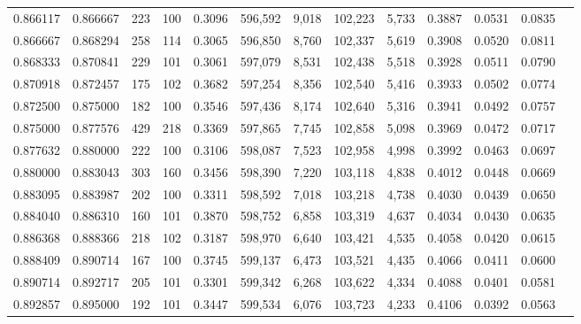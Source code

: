 \begin{tabular}{rrrrrrrrrrrrr}
0.866117 & 0.866667 &    223 &   100 &                                     0.3096 & 596,592 &   9,018 & 102,223 &   5,733 & 0.3887 & 0.0531 & 0.0835 \\
0.866667 & 0.868294 &    258 &   114 &                                     0.3065 & 596,850 &   8,760 & 102,337 &   5,619 & 0.3908 & 0.0520 & 0.0811 \\
0.868333 & 0.870841 &    229 &   101 &                                     0.3061 & 597,079 &   8,531 & 102,438 &   5,518 & 0.3928 & 0.0511 & 0.0790 \\
0.870918 & 0.872457 &    175 &   102 &                                     0.3682 & 597,254 &   8,356 & 102,540 &   5,416 & 0.3933 & 0.0502 & 0.0774 \\
0.872500 & 0.875000 &    182 &   100 &                                     0.3546 & 597,436 &   8,174 & 102,640 &   5,316 & 0.3941 & 0.0492 & 0.0757 \\
0.875000 & 0.877576 &    429 &   218 &                                     0.3369 & 597,865 &   7,745 & 102,858 &   5,098 & 0.3969 & 0.0472 & 0.0717 \\
0.877632 & 0.880000 &    222 &   100 &                                     0.3106 & 598,087 &   7,523 & 102,958 &   4,998 & 0.3992 & 0.0463 & 0.0697 \\
0.880000 & 0.883043 &    303 &   160 &                                     0.3456 & 598,390 &   7,220 & 103,118 &   4,838 & 0.4012 & 0.0448 & 0.0669 \\
0.883095 & 0.883987 &    202 &   100 &                                     0.3311 & 598,592 &   7,018 & 103,218 &   4,738 & 0.4030 & 0.0439 & 0.0650 \\
0.884040 & 0.886310 &    160 &   101 &                                     0.3870 & 598,752 &   6,858 & 103,319 &   4,637 & 0.4034 & 0.0430 & 0.0635 \\
0.886368 & 0.888366 &    218 &   102 &                                     0.3187 & 598,970 &   6,640 & 103,421 &   4,535 & 0.4058 & 0.0420 & 0.0615 \\
0.888409 & 0.890714 &    167 &   100 &                                     0.3745 & 599,137 &   6,473 & 103,521 &   4,435 & 0.4066 & 0.0411 & 0.0600 \\
0.890714 & 0.892717 &    205 &   101 &                                     0.3301 & 599,342 &   6,268 & 103,622 &   4,334 & 0.4088 & 0.0401 & 0.0581 \\
0.892857 & 0.895000 &    192 &   101 &                                     0.3447 & 599,534 &   6,076 & 103,723 &   4,233 & 0.4106 & 0.0392 & 0.0563 \\

\end{tabular}
